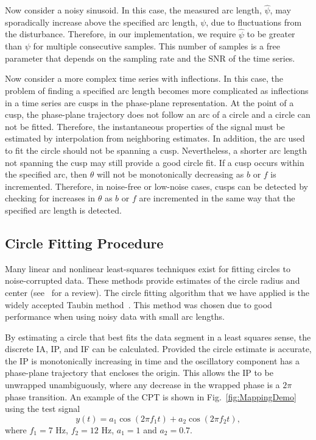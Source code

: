 \documentclass[a4paper]{IEEEtran}
\begin{document}
Now consider a noisy sinusoid. In this case, the measured arc length, $\hat\psi$, may sporadically increase above the specified arc length, $\psi$, due to fluctuations from the disturbance. Therefore, in our implementation, we require $\hat\psi$ to be greater than $\psi$ for multiple consecutive samples. This number of samples is a free parameter that depends on the sampling rate and the SNR of the time series.

Now consider a more complex time series with inflections. In this case, the problem of finding a specified arc length becomes more complicated as inflections in a time series are cusps in the phase-plane representation. At the point of a cusp, the phase-plane trajectory does not follow an arc of a circle and a circle can not be fitted. Therefore, the instantaneous properties of the signal must be estimated by interpolation from neighboring estimates. In addition, the arc used to fit the circle should not be spanning a cusp. Nevertheless, a shorter arc length not spanning the cusp may still provide a good circle fit. If a cusp occurs within the specified arc, then $\theta$ will not be monotonically decreasing as $b$ or $f$ is incremented. Therefore, in noise-free or low-noise cases, cusps can be detected by checking for increases in $\theta$ as $b$ or $f$ are incremented in the same way that the specified arc length is detected. 

\subsection{Circle Fitting Procedure}\label{sect:CircleFittingProcedure}
Many linear and nonlinear least-squares techniques exist for fitting circles to noise-corrupted data. These methods provide estimates of the circle radius and center (see~\cite{Chernov2005} for a review). The circle fitting algorithm that we have applied is the widely accepted Taubin method~\cite{Taubin1991}. This method was chosen due to good performance when using noisy data with small arc lengths.

By estimating a circle that best fits the data segment in a least squares sense, the discrete IA, IP, and IF can be calculated. Provided the circle estimate is accurate, the IP is monotonically increasing in time and the oscillatory component has a phase-plane trajectory that encloses the origin. This allows the IP to be unwrapped unambiguously, where any decrease in the wrapped phase is a $2\pi$ phase transition. An example of the CPT is shown in Fig.~\ref{fig:MappingDemo} using the test signal
\begin{equation}\label{eq:SecondTestSig}
y\left( t \right) = a_1\cos \left(2\pi f_1 t\right) + a_2\cos \left(2\pi f_2 t\right),
\end{equation}
where $f_1 = 7$ Hz, $f_2 = 12$ Hz, $a_1 = 1$ and $a_2=0.7$.
\end{document}
